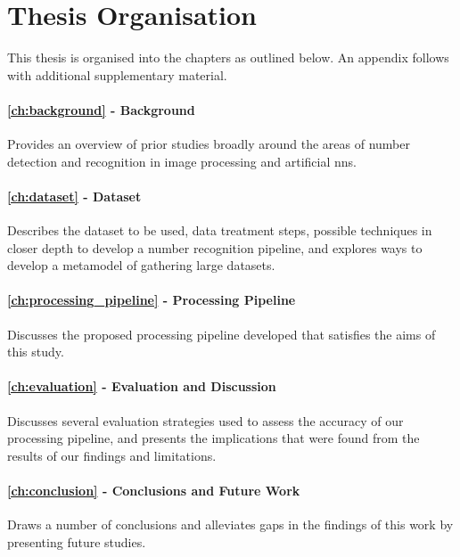 \section{Thesis Organisation}
\label{sec:introduction:organisation}

This thesis is organised into the chapters as outlined below. An appendix follows with additional supplementary material.

\paragraph{\cref{ch:background} - Background} Provides an overview of prior studies broadly around the areas of number detection and recognition in image processing and artificial \glspl{nn}.

\paragraph{\cref{ch:dataset} - Dataset} Describes the dataset to be used, data treatment steps, possible techniques in closer depth to develop a number recognition pipeline, and explores ways to develop a metamodel of gathering large datasets.

\paragraph{\cref{ch:processing_pipeline} - Processing Pipeline} Discusses the proposed processing pipeline developed that satisfies the aims of this study.

\paragraph{\cref{ch:evaluation} - Evaluation and Discussion} Discusses several evaluation strategies used to assess the accuracy of our processing pipeline, and presents the implications that were found from the results of our findings and limitations.

\paragraph{\cref{ch:conclusion} - Conclusions and Future Work} Draws a number of conclusions and alleviates gaps in the findings of this work by presenting future studies.